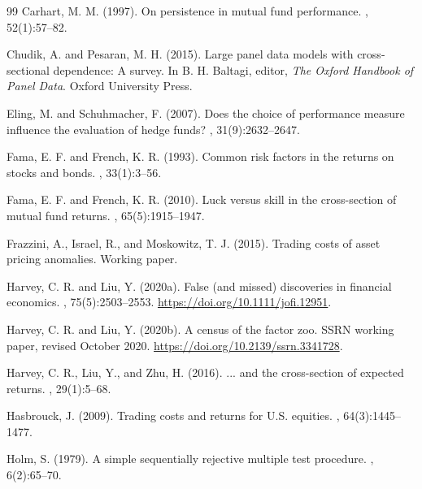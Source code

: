 \documentclass[12pt,a4paper]{article}
\begin{document}
\begin{thebibliography}{99}
Carhart, M. M. (1997).
\newblock On persistence in mutual fund performance.
, 52(1):57--82.

Chudik, A. and Pesaran, M. H. (2015).
\newblock Large panel data models with cross-sectional dependence: A survey.
\newblock In B. H. Baltagi, editor, {\em The Oxford Handbook of Panel Data}.
Oxford University Press.

Eling, M. and Schuhmacher, F. (2007).
\newblock Does the choice of performance measure influence the evaluation of
hedge funds?
, 31(9):2632--2647.

Fama, E. F. and French, K. R. (1993).
\newblock Common risk factors in the returns on stocks and bonds.
, 33(1):3--56.

Fama, E. F. and French, K. R. (2010).
\newblock Luck versus skill in the cross-section of mutual fund returns.
, 65(5):1915--1947.

Frazzini, A., Israel, R., and Moskowitz, T. J. (2015).
\newblock Trading costs of asset pricing anomalies.
\newblock Working paper.

Harvey, C. R. and Liu, Y. (2020a).
\newblock False (and missed) discoveries in financial economics.
, 75(5):2503--2553.
\newblock \url{https://doi.org/10.1111/jofi.12951}.

Harvey, C. R. and Liu, Y. (2020b).
\newblock A census of the factor zoo.
\newblock SSRN working paper, revised October 2020.
\newblock \url{https://doi.org/10.2139/ssrn.3341728}.

Harvey, C. R., Liu, Y., and Zhu, H. (2016).
\newblock ... and the cross-section of expected returns.
, 29(1):5--68.

Hasbrouck, J. (2009).
\newblock Trading costs and returns for U.S. equities.
, 64(3):1445--1477.

Holm, S. (1979).
\newblock A simple sequentially rejective multiple test procedure.
, 6(2):65--70.


\end{thebibliography}
\end{document}
